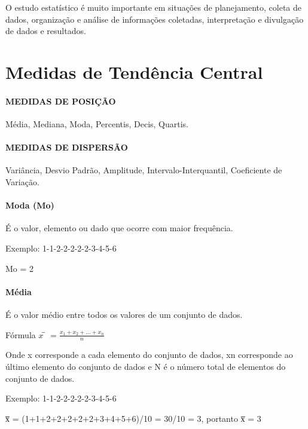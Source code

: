 \documentclass[]{book}
\begin{document}
O estudo estatístico é muito importante em situações de planejamento, coleta de dados, organização e análise de informações coletadas, interpretação e divulgação de dados e resultados.

\hypertarget{medidas-de-tendencia-central}{%
\chapter{Medidas de Tendência Central}\label{medidas-de-tendencia-central}}

\hypertarget{medidas-de-posicao}{%
\subsubsection{MEDIDAS DE POSIÇÃO}\label{medidas-de-posicao}}

Média, Mediana, Moda, Percentis, Decis, Quartis.

\hypertarget{medidas-de-dispersao}{%
\subsubsection{MEDIDAS DE DISPERSÃO}\label{medidas-de-dispersao}}

Variância, Desvio Padrão, Amplitude, Intervalo-Interquantil, Coeficiente de Variação.

\hypertarget{moda-mo}{%
\subsubsection{Moda (Mo)}\label{moda-mo}}

É o valor, elemento ou dado que ocorre com maior frequência.

Exemplo: 1-1-2-2-2-2-2-3-4-5-6

Mo = 2

\hypertarget{media}{%
\subsubsection{Média}\label{media}}

É o valor médio entre todos os valores de um conjunto de dados.

Fórmula \(x̅ =\frac{x_1 + x_2 + ... + x_n}{n}\)

Onde x corresponde a cada elemento do conjunto de dados, xn corresponde ao
último elemento do conjunto de dados e N é o número total de elementos do conjunto de dados.

Exemplo: 1-1-2-2-2-2-2-3-4-5-6

x̅ = (1+1+2+2+2+2+2+3+4+5+6)/10 = 30/10 = 3, portanto x̅ = 3
\end{document}
